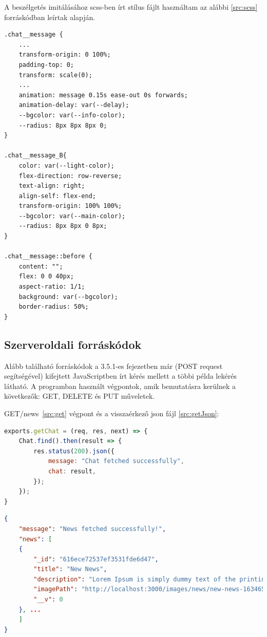 A beszélgetés imitálásához scss-ben írt stílus fájlt használtam az alábbi \ref{src:scss} forráskódban leírtak alapján.

\begin{lstlisting}
.chat__message {
	...
	transform-origin: 0 100%;
	padding-top: 0;
	transform: scale(0);
	...
	animation: message 0.15s ease-out 0s forwards;
	animation-delay: var(--delay);
	--bgcolor: var(--info-color);
	--radius: 8px 8px 8px 0;
}

.chat__message_B{
	color: var(--light-color);
	flex-direction: row-reverse;
	text-align: right;
	align-self: flex-end;
	transform-origin: 100% 100%;
	--bgcolor: var(--main-color);
	--radius: 8px 8px 0 8px;
}

.chat__message::before {
	content: "";
	flex: 0 0 40px;
	aspect-ratio: 1/1;
	background: var(--bgcolor);
	border-radius: 50%;
}
\end{lstlisting}

\subsection{Szerveroldali forráskódok}
Alább található forráskódok a 3.5.1-es fejezetben már (POST request segítségével) kifejtett JavaScriptben írt kérés mellett a többi példa lekérés látható. A programban használt végpontok, amik bemutatásra kerülnek a következők: GET, DELETE és PUT műveletek.

GET/news~\ref{src:get} végpont és a visszaérkező json fájl \ref{src:getJson}:

\begin{lstlisting}[language=JavaScript]
exports.getChat = (req, res, next) => {
	Chat.find().then(result => {
		res.status(200).json({
			message: "Chat fetched successfully",
			chat: result,
		});
	});
}
\end{lstlisting}

\begin{lstlisting}[language={JSON}]
{
	"message": "News fetched successfully!",
	"news": [
	{
		"_id": "616ece72537ef3531fde6d47",
		"title": "New News",
		"description": "Lorem Ipsum is simply dummy text of the printing and typesetting industry. Lorem Ipsum has been the industry's standard dummy text ever since the 1500s, when an unknown printer took a galley of type and scrambled it to make a type specimen book. It has survived not only five centuries, but also the leap into electronic typesetting, remaining essentially unchanged.",
		"imagePath": "http://localhost:3000/images/news/new-news-1634651762652.jpg",
		"__v": 0
	}, ...
	]
}
\end{lstlisting}


